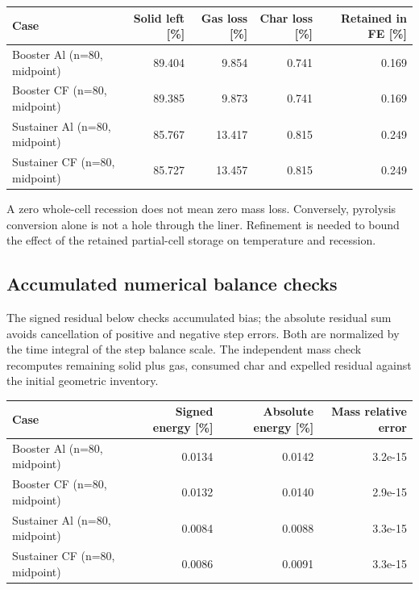 \documentclass[oneside,openany]{amsdtx}
\begin{document}
\begin{table}[H]\centering\scriptsize\begin{tabular}{lrrrr}\toprule Case & Solid left [\%] & Gas loss [\%] & Char loss [\%] & Retained in FE [\%]\\\midrule

Booster Al (n=80, midpoint) & 89.404 & 9.854 & 0.741 & 0.169 \\
Booster CF (n=80, midpoint) & 89.385 & 9.873 & 0.741 & 0.169 \\
Sustainer Al (n=80, midpoint) & 85.767 & 13.417 & 0.815 & 0.249 \\
Sustainer CF (n=80, midpoint) & 85.727 & 13.457 & 0.815 & 0.249 \\

\bottomrule\end{tabular}\end{table}

A zero whole-cell recession does not mean zero mass loss. Conversely, pyrolysis conversion alone is not a hole through the liner. Refinement is needed to bound the effect of the retained partial-cell storage on temperature and recession.

\subsection{Accumulated numerical balance checks}

The signed residual below checks accumulated bias; the absolute residual sum avoids cancellation of positive and negative step errors. Both are normalized by the time integral of the step balance scale. The independent mass check recomputes remaining solid plus gas, consumed char and expelled residual against the initial geometric inventory.

\begin{table}[H]\centering\scriptsize\begin{tabular}{lrrr}\toprule Case & Signed energy [\%] & Absolute energy [\%] & Mass relative error\\\midrule

Booster Al (n=80, midpoint) & 0.0134 & 0.0142 & 3.2e-15 \\
Booster CF (n=80, midpoint) & 0.0132 & 0.0140 & 2.9e-15 \\
Sustainer Al (n=80, midpoint) & 0.0084 & 0.0088 & 3.3e-15 \\
Sustainer CF (n=80, midpoint) & 0.0086 & 0.0091 & 3.3e-15 \\

\bottomrule\end{tabular}\end{table}
\end{document}
